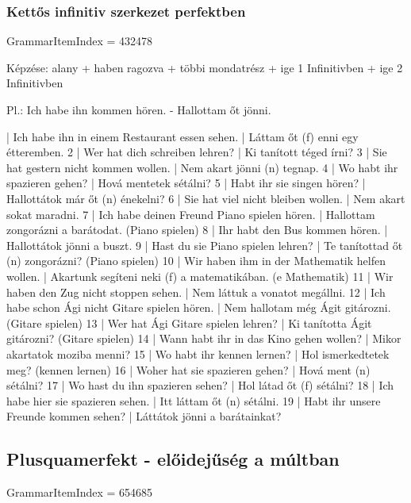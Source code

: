 \documentclass{article}
\newenvironment{desc}{\verbatim}{\endverbatim}
\newenvironment{exmp}{\verbatim}{\endverbatim}
\begin{document}
\subsubsection{Kettős infinitiv szerkezet perfektben}

GrammarItemIndex = 432478

\begin{desc}
Képzése:
alany + haben ragozva + többi mondatrész + ige 1 Infinitivben + ige 2 Infinitivben

Pl.: Ich habe ihn kommen hören. - Hallottam őt jönni.
\end{desc}

\begin{exmp}
1 | Ich habe ihn in einem Restaurant essen sehen. | Láttam őt (f) enni egy étteremben.
2 | Wer hat dich schreiben lehren? | Ki tanított téged írni?
3 | Sie hat gestern nicht kommen wollen. | Nem akart jönni (n) tegnap.
4 | Wo habt ihr spazieren gehen? | Hová mentetek sétálni? 
5 | Habt ihr sie singen hören? | Hallottátok már őt (n) énekelni?
6 | Sie hat viel nicht bleiben wollen. | Nem akart sokat maradni.
7 | Ich habe deinen Freund Piano spielen hören. | Hallottam zongorázni a barátodat. (Piano spielen)
8 | Ihr habt den Bus kommen hören. | Hallottátok jönni a buszt.
9 | Hast du sie Piano spielen lehren? | Te tanítottad őt (n) zongorázni? (Piano spielen)
10 | Wir haben ihm in der Mathematik helfen wollen. | Akartunk segíteni neki (f) a matematikában. (e Mathematik)
11 | Wir haben den Zug nicht stoppen sehen. | Nem láttuk a vonatot megállni.
12 | Ich habe schon Ági nicht Gitare spielen hören. | Nem hallotam még Ágit gitározni. (Gitare spielen)
13 | Wer hat Ági Gitare spielen lehren? | Ki tanította Ágit gitározni? (Gitare spielen)
14 | Wann habt ihr in das Kino gehen wollen? | Mikor akartatok moziba menni?
15 | Wo habt ihr kennen lernen? | Hol ismerkedtetek meg? (kennen lernen)
16 | Woher hat sie spazieren gehen? | Hová ment (n) sétálni?
17 | Wo hast du ihn spazieren sehen? | Hol látad őt (f) sétálni?
18 | Ich habe hier sie spazieren sehen. | Itt láttam őt (n) sétálni.
19 | Habt ihr unsere Freunde kommen sehen? | Láttátok jönni a barátainkat?
\end{exmp}

\subsection{Plusquamerfekt - előidejűség a múltban}

GrammarItemIndex = 654685
\end{document}
